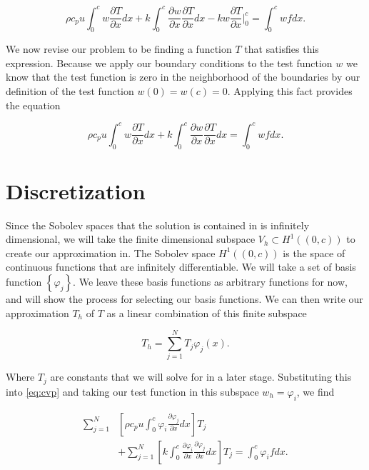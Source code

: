 \documentclass[10pt]{amsart}
\numberwithin{equation}{section}
\theoremstyle{definition}
\newcommand{\pder}[2][]{\frac{\partial#1}{\partial#2}}
\begin{document}
\begin{multicols}{2}
  \begin{equation*}
    \rho c_p u\int_0^cw\pder[T]{x}dx+k\int_0^c\pder[w]{x}\pder[T]{x}dx-kw\pder[T]{x}\Bigr|_0^c=\int_0^cwfdx.
  \end{equation*}

  We now revise our problem to be finding a function $T$ that satisfies this
  expression. Because we apply our boundary conditions to the test function $w$
  we know that the test function is zero in the neighborhood of the boundaries
  by our definition of the test function $w(0)=w(c)=0$. Applying this fact
  provides the equation

  \begin{equation}\label{eq:cvp}
    \rho c_p
    u\int_0^cw\pder[T]{x}dx+k\int_0^c\pder[w]{x}\pder[T]{x}dx=\int_0^cwfdx.
  \end{equation}

  \section{Discretization}%
  \label{sec:discretization}

  Since the Sobolev spaces that the solution is contained in is infinitely
  dimensional, we will take the finite dimensional subspace $V_h\subset
  H^1((0,c))$ to create our approximation in. The Sobolev space $H^1((0,c))$ is
  the space of continuous functions that are infinitely differentiable. We will
  take a set of basis function $\left\{\varphi_j\right\}$. We leave these basis
  functions as arbitrary functions for now, and will show the process for
  selecting our basis functions.  We can then write our approximation $T_h$ of
  $T$ as a linear combination of this finite subspace

  \begin{equation}\label{eq:th}
    T_h=\sum_{j=1}^{N}T_j\varphi_j(x).
  \end{equation}

  Where $T_j$ are constants that we will solve for in a later stage.
  Substituting this into \eqref{eq:cvp} and taking our test function in this
  subspace $w_h=\varphi_i$, we find

  \begin{align*}
    \sum_{j=1}^{N}&\left[\rho c_pu
    \int_0^c\varphi_i\pder[\varphi_j]{x}dx\right]T_j\\
    &+
  \sum_{j=1}^{N}\left[k\int_0^c\pder[\varphi_i]{x}\pder[\varphi_j]{x}dx\right]T_j
    =\int_0^c\varphi_ifdx.
  \end{align*}


\end{multicols}
\end{document}
